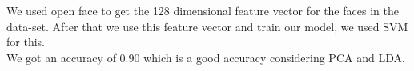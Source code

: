 We used open face to get the 128 dimensional feature vector for the faces in the data-set. After that we use this feature vector and train our model, we used SVM for this.\\
We got an accuracy of 0.90 which is a good accuracy considering PCA and LDA.